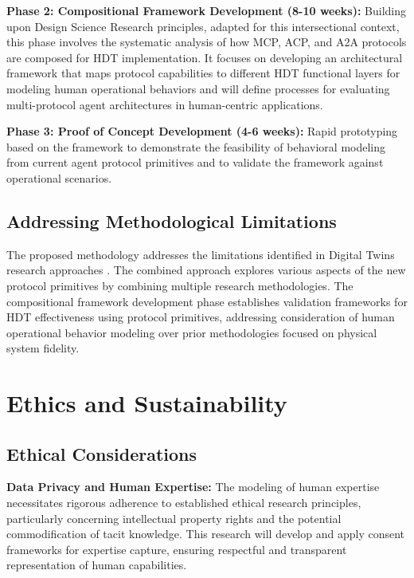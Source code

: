 \documentclass[12pt,a4paper]{article}
\begin{document}
\textbf{Phase 2: Compositional Framework Development (8-10 weeks):} Building upon Design Science Research principles, adapted for this intersectional context, this phase involves the systematic analysis of how MCP, ACP, and A2A protocols are composed for HDT implementation. It focuses on developing an architectural framework that maps protocol capabilities to different HDT functional layers for modeling human operational behaviors and will define processes for evaluating multi-protocol agent architectures in human-centric applications.

\textbf{Phase 3: Proof of Concept Development (4-6 weeks):} Rapid prototyping based on the framework to demonstrate the feasibility of behavioral modeling from current agent protocol primitives and to validate the framework against operational scenarios.

\subsection{Addressing Methodological Limitations}

The proposed methodology addresses the limitations identified in Digital Twins research approaches \cite{10.1186/s10033-024-00998-7} \cite{10.1016/j.ifacol.2022.09.675}. The combined approach explores various aspects of the new protocol primitives by combining multiple research methodologies. The compositional framework development phase establishes validation frameworks for HDT effectiveness using protocol primitives, addressing consideration of human operational behavior modeling over prior methodologies focused on physical system fidelity.

\section{Ethics and Sustainability}
\label{sec:ethics}

\subsection{Ethical Considerations}

\noindent \textbf{Data Privacy and Human Expertise:} The modeling of human expertise necessitates rigorous adherence to established ethical research principles, particularly concerning intellectual property rights and the potential commodification of tacit knowledge. This research will develop and apply consent frameworks for expertise capture, ensuring respectful and transparent representation of human capabilities.
\end{document}
